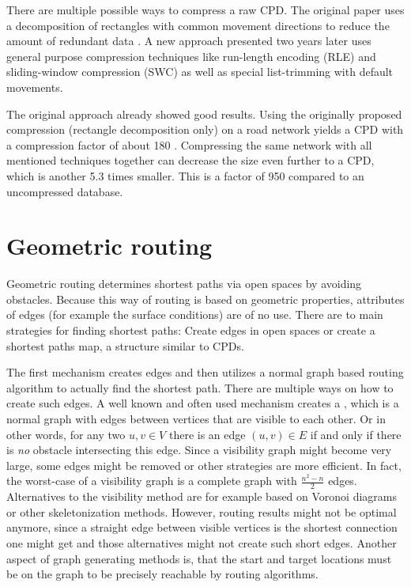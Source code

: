 			There are multiple possible ways to compress a raw CPD.
			The original paper uses a decomposition of rectangles with common movement directions to reduce the amount of redundant data \cite[1]{botea-cpd-2011}.
			A new approach presented two years later uses general purpose compression techniques like run-length encoding (RLE) and sliding-window compression (SWC) as well as special list-trimming with default movements.
			
			The original approach already showed good results.
			Using the originally proposed compression (rectangle decomposition only) on a road network yields a CPD with a compression factor of about 180 \cite[4]{botea-cpd-2013}.
			Compressing the same network with all mentioned techniques together can decrease the size even further to a CPD, which is another 5.3 times smaller.
			This is a factor of 950 compared to an uncompressed database.
	
\section{Geometric routing}
\label{sec:geometric-routing}

	Geometric routing determines shortest paths via open spaces by avoiding obstacles.
	Because this way of routing is based on geometric properties, attributes of edges (for example the surface conditions) are of no use.
	There are to main strategies for finding shortest paths:
	Create edges in open spaces or create a shortest paths map, a structure similar to CPDs.
	
	The first mechanism creates edges and then utilizes a normal graph based routing algorithm to actually find the shortest path.
	There are multiple ways on how to create such edges.
	A well known and often used mechanism creates a , which is a normal graph with edges between vertices that are visible to each other.
	Or in other words, for any two $u, v \in V$ there is an edge $(u, v) \in E$ if and only if there is \textit{no} obstacle intersecting this edge.
	Since a visibility graph might become very large, some edges might be removed or other strategies are more efficient.
	In fact, the worst-case of a visibility graph is a complete graph with $\frac{n^2 - n}{2}$ edges.
	Alternatives to the visibility method are for example based on Voronoi diagrams or other skeletonization methods\cite[3-4]{graser-osm-open-spaces}.
	However, routing results might not be optimal anymore, since a straight edge between visible vertices is the shortest connection one might get and those alternatives might not create such short edges\cite[7]{graser-osm-open-spaces}.
	Another aspect of graph generating methods is, that the start and target locations must be on the graph to be precisely reachable by routing algorithms.
	
